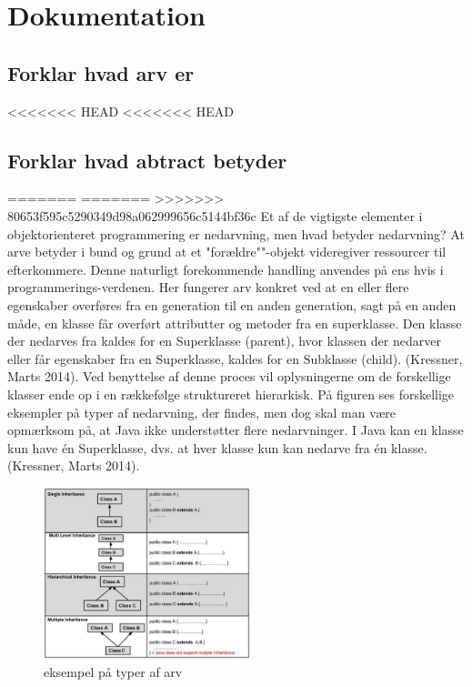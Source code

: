\section{Dokumentation}
\subsection{Forklar hvad arv er}
<<<<<<< HEAD
<<<<<<< HEAD

\subsection{Forklar hvad abtract betyder}
=======
=======
>>>>>>> 80653f595c5290349d98a062999656c5144bf36c
Et af de vigtigste elementer i objektorienteret programmering er nedarvning, men hvad betyder nedarvning? At arve betyder i bund og grund at et "forældre""-objekt videregiver ressourcer til efterkommere. Denne naturligt forekommende handling anvendes på ens hvis i programmerings-verdenen. Her fungerer arv konkret ved at en eller flere egenskaber overføres fra en generation til en anden generation, sagt på en anden måde, en klasse får overført attributter og metoder fra en superklasse. Den klasse der nedarves fra kaldes for en Superklasse (parent), hvor klassen der nedarver eller får egenskaber fra en Superklasse, kaldes for en Subklasse (child). (Kressner, Marts 2014).
Ved benyttelse af denne proces vil oplysningerne om de forskellige klasser ende op i en rækkefølge struktureret hierarkisk. 
På figuren ses forskellige eksempler på typer af nedarvning, der findes, men dog skal man være opmærksom på, at Java ikke understøtter flere nedarvninger. I Java kan en klasse kun have én Superklasse, dvs. at hver klasse kun kan nedarve fra én klasse. (Kressner, Marts 2014).
\begin{figure}[h]\label{fig:types_of_inheritance.jpg} 
    \advance\leftskip-3cm
    \includegraphics[width=6cm]{fig/types_of_inheritance.jpg}
    \caption{eksempel på typer af arv}
\end{figure}
